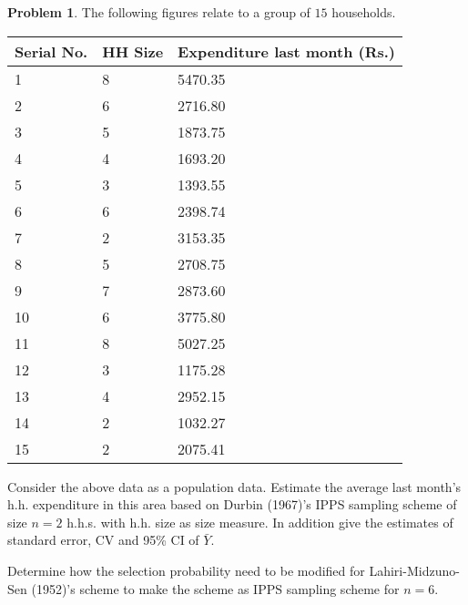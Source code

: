 \documentclass[12pt]{article}
\theoremstyle{definition}
\newtheorem*{prb}{Problem}
\newenvironment{problem}{
\begin{tcolorbox}[colback=blue!5!white,colframe=blue!75!black, parbox = true] \begin{prb}  }{\end{prb}\end{tcolorbox} }
\begin{document}
\begin{problem}
	The following figures relate to a group of $15$ households.
	\begin{center}
		\begin{tabular}{|l|l|l|}
			\hline
			Serial No. & HH Size & Expenditure last month (Rs.)  \\ \hline
			1 & 8 & 5470.35 \\ \hline
			2 & 6 & 2716.80 \\ \hline
			3& 5& 1873.75 \\ \hline
			4& 4& 1693.20\\ \hline
			5& 3& 1393.55\\ \hline
			6& 6& 2398.74 \\ \hline
			7& 2& 3153.35\\ \hline
			8& 5& 2708.75\\ \hline
			9& 7& 2873.60\\ \hline
			10& 6& 3775.80\\ \hline
			11& 8& 5027.25\\ \hline
			12& 3& 1175.28\\ \hline
			13& 4& 2952.15\\ \hline
			14& 2& 1032.27\\ \hline
			15& 2& 2075.41\\ \hline
		\end{tabular}
	\end{center}
	
	 Consider the above data as a population data. Estimate the average last month's h.h. expenditure in this area based on Durbin (1967)'s IPPS sampling scheme of size $n=2$ h.h.s. with h.h. size as size measure. In addition give the estimates of standard error, CV and 95\% CI of  $\bar{Y}$.


	 Determine how the selection probability need to be modified for  Lahiri-Midzuno-Sen (1952)'s scheme to make the scheme as IPPS sampling scheme for $n=6$.
\end{problem}
\end{document}
